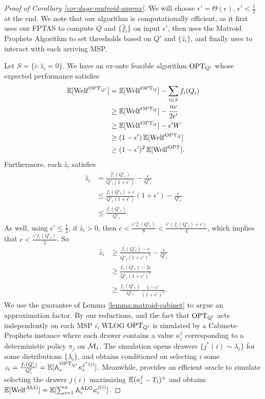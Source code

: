 \begin{proof}[Proof of Corollary \ref{cor:dags-matroid-approx}]
  We will choose $\epsilon' = \Theta(\epsilon)$, $\epsilon' < \frac{1}{2}$ at the end.
  We note that our algorithm is computationally efficient, as it first uses our FPTAS to compute $Q$ and $\{\hat{f}_i\}$ on input $\epsilon'$, then uses the Matroid Prophets Algorithm to set thresholds based on $Q'$ and $\{\hat{z}_i\}$, and finally uses \MAXSAUP{} to interact with each arriving MSP.

  Let $S = \{i : \hat{z}_i = 0\}$.
  We have an ex-ante feasible algorithm $\mathrm{OPT}_{Q'}$ whose expected performance satisfies
  \begin{align*}
    \operatorname*{\mathbb{E}}[\mathrm{Welf}^{\mathrm{OPT}_{Q'}}]
    &= \operatorname*{\mathbb{E}}[\mathrm{Welf}^{\mathrm{OPT}_Q}] - \sum_{i \in S} f_i(Q_i)  \\
    &\geq \operatorname*{\mathbb{E}}[\mathrm{Welf}^{\mathrm{OPT}_Q}] - \frac{nc}{2\epsilon'} \\
    &\geq \operatorname*{\mathbb{E}}[\mathrm{Welf}^{\mathrm{OPT}_Q}] - \epsilon' W \\
    &\geq (1-\epsilon') \operatorname*{\mathbb{E}}[\mathrm{Welf}^{\mathrm{OPT}_Q}]  \\
    &\geq (1-\epsilon')^2 \operatorname*{\mathbb{E}}[\mathrm{Welf}^{\mathrm{OPT}}] .
  \end{align*}
  Furthermore, each $\hat{z}_i$ satisfies
  \begin{align*}
    \hat{z}_i
    &=    \frac{\hat{f}_i(Q'_i)}{Q'_i(1+\epsilon')} - \frac{c}{Q'_i}  \\
    &\leq \frac{f_i(Q'_i) + c}{Q'_i(1+\epsilon')}(1+\epsilon') - \frac{c}{Q'_i}  \\
    &\leq \frac{f_i(Q'_i)}{Q'_i} .
  \end{align*}
  As well, using $\epsilon' \leq \tfrac{1}{2}$, if $\hat{z}_i > 0$, then $c < \frac{\epsilon' \hat{f}_i(Q'_i)}{8} < \frac{\epsilon' (f_i(Q'_i)+c)}{4}$, which implies that $c < \frac{\epsilon' f_i(Q'_i)}{2}$.
  So
  \begin{align*}
    \hat{z}_i
    &\geq \frac{f_i(Q'_i) - c}{Q'_i(1+\epsilon')^2} - \frac{c}{Q'_i}  \\
    &\geq \frac{f_i(Q'_i) - 2c}{Q'_i(1+\epsilon')^2}  \\
    &\geq \frac{f_i(Q'_i)}{Q'_i} \frac{1-\epsilon'}{(1+\epsilon')^2} .
  \end{align*}
  We use the guarantee of Lemma \ref{lemma:matroid-cabinet} to argue an approximation factor.
  By our reductions,  and the fact that $\mathrm{OPT}_{Q'}$ acts independently on each MSP $i$, WLOG $\mathrm{OPT}_{Q'}$ is simulated by a Cabinets-Prophets instance where each drawer contains a value $\kappa_i^j$ corresponding to a deterministic policy $\pi_j$ on $\mathcal{M}_i$.
  The simulation opens drawers $\{j^*(i) \sim \lambda_i\}$ for some distributions $\{\lambda_i\}$, and obtains conditioned on selecting $i$ some $z_i = \frac{f_i(Q'_i)}{Q_i'} = \operatorname*{\mathbb{E}}[ \mathbb{A}^{\mathrm{OPT}_{Q'}}_i \kappa_i^{j^*(i)}]$.
  Meanwhile, \MAXSAUP{} provides an efficient oracle to simulate selecting the drawer $j(i)$ maximizing $\operatorname*{\mathbb{E}}(\kappa_i^j - T_i)^+$ and obtains $\operatorname*{\mathbb{E}}[\mathrm{Welf}^{\mathrm{ALG}}] = \operatorname*{\mathbb{E}}[ \sum_{i=1}^n \mathbb{A}^{\mathrm{ALG}}_i \kappa_i^{j(i)}]$.


\end{proof}
